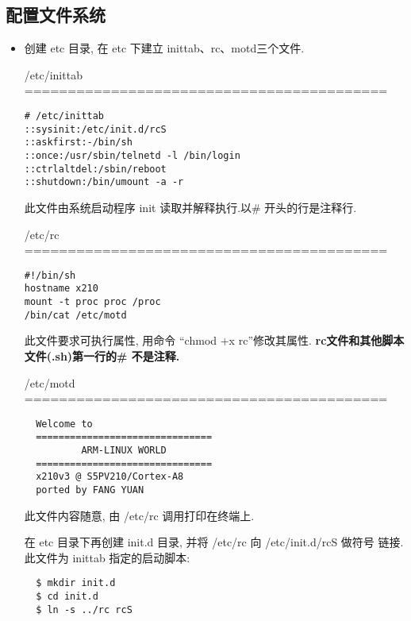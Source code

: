 \subsection{配置文件系统}
\begin{itemize}\itemsep=-3pt
  \item 创建 etc 目录, 在 etc 下建立 inittab、rc、motd三个文件.

	/etc/inittab \\ ==========================================

\begin{boxedminipage}{.9\textwidth}
\begin{verbatim}
# /etc/inittab
::sysinit:/etc/init.d/rcS
::askfirst:-/bin/sh
::once:/usr/sbin/telnetd -l /bin/login
::ctrlaltdel:/sbin/reboot
::shutdown:/bin/umount -a -r
\end{verbatim}
\end{boxedminipage}

	此文件由系统启动程序 init 读取并解释执行.以\# 开头的行是注释行.

	/etc/rc \\ ==========================================

\begin{boxedminipage}{.9\textwidth}
\begin{verbatim}
#!/bin/sh
hostname x210
mount -t proc proc /proc
/bin/cat /etc/motd
\end{verbatim}
\end{boxedminipage}

	此文件要求可执行属性, 用命令 ``chmod +x rc''修改其属性.
{\bf rc文件和其他脚本文件(.sh)第一行的\# 不是注释.}

	/etc/motd \\ ==========================================

\begin{boxedminipage}{.9\textwidth}
\begin{verbatim}
  Welcome to
  ===============================
          ARM-LINUX WORLD
  ===============================
  x210v3 @ S5PV210/Cortex-A8
  ported by FANG YUAN
\end{verbatim}
\end{boxedminipage}

	此文件内容随意, 由 /etc/rc 调用打印在终端上.

	在 etc 目录下再创建 init.d 目录, 并将 /etc/rc 向 /etc/init.d/rcS 做符号
链接.此文件为 inittab 指定的启动脚本:

\begin{boxedminipage}{.9\textwidth}
\begin{verbatim}
  $ mkdir init.d
  $ cd init.d
  $ ln -s ../rc rcS
\end{verbatim}
\end{boxedminipage}


\end{itemize}

